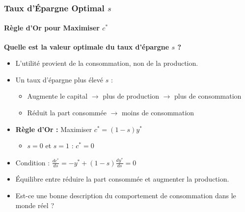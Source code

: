 \documentclass{beamer}
\begin{document}
\begin{frame}
    \frametitle{Taux d'Épargne Optimal \( s \)}
    \framesubtitle{Règle d'Or pour Maximiser \( c^* \)}

    \textbf{Quelle est la valeur optimale du taux d'épargne \( s \) ?}
    \begin{itemize}
        \item L'utilité provient de la consommation, non de la production.
        \item Un taux d'épargne plus élevé \( s \) :
            \begin{itemize}
                \item Augmente le capital \(\rightarrow\) plus de production \(\rightarrow\) plus de consommation
                \item Réduit la part consommée \(\rightarrow\) moins de consommation
            \end{itemize}
        \item \textbf{Règle d'Or :} Maximiser \( c^* = (1-s)y^* \)
            \begin{itemize}
                \item \( s = 0 \) et \( s = 1 \) : \( c^* = 0 \)
            \end{itemize}
        \item Condition : \(\frac{dc^*}{ds} = -y^* + (1-s)\frac{dy^*}{ds} = 0\)
        \item Équilibre entre réduire la part consommée et augmenter la production.
        \item Est-ce une bonne description du comportement de consommation dans le monde réel ?
    \end{itemize}
\end{frame}


\end{document}
